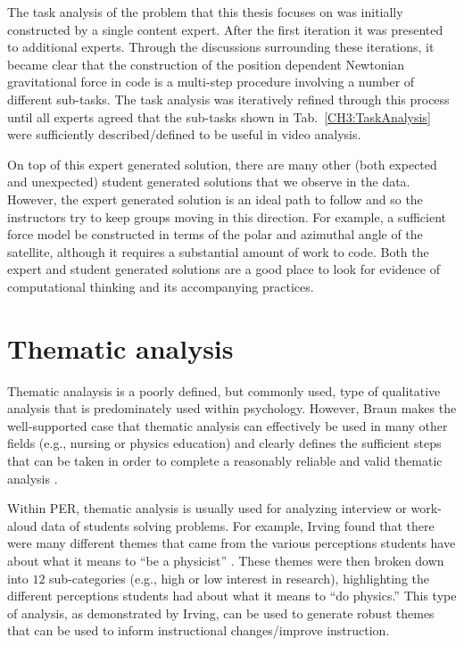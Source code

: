 \documentclass{msuphddissertation}
\begin{document}
\begin{doublespace}
The task analysis of the problem that this thesis focuses on was initially constructed by a single content expert.  After the first iteration it was presented to additional experts.  Through the discussions surrounding these iterations, it became clear that the construction of the position dependent Newtonian gravitational force in code is a multi-step procedure involving a number of different sub-tasks.  The task analysis was iteratively refined through this process until all experts agreed that the sub-tasks shown in Tab.~\ref{CH3:TaskAnalysis} were sufficiently described/defined to be useful in video analysis.
 
On top of this expert generated solution, there are many other (both expected and unexpected) student generated solutions that we observe in the data.  However, the expert generated solution is an ideal path to follow and so the instructors try to keep groups moving in this direction.  For example, a sufficient force model be constructed in terms of the polar and azimuthal angle of the satellite, although it requires a substantial amount of work to code.  Both the expert and student generated solutions are a good place to look for evidence of computational thinking and its accompanying practices.

\section{Thematic analysis}\label{CH2:Thematic}

Thematic analaysis is a poorly defined, but commonly used, type of qualitative analysis that is predominately used within psychology.  However, Braun makes the well-supported case that thematic analysis can effectively be used in many other fields (e.g., nursing or physics education) and clearly defines the sufficient steps that can be taken in order to complete a reasonably reliable and valid thematic analysis \cite{Braun2008,Fereda2006,Aronson1995,Vaismoradi2013,Joffe2004,Potter1997,Antaki2002}.

Within PER, thematic analysis is usually used for analyzing interview or work-aloud data of students solving problems.  For example, Irving found that there were many different themes that came from the various perceptions students have about what it means to ``be a physicist'' \cite{Irving2016}.  These themes were then broken down into $12$ sub-categories (e.g., high or low interest in research), highlighting the different perceptions students had about what it means to ``do physics.''  This type of analysis, as demonstrated by Irving, can be used to generate robust themes that can be used to inform instructional changes/improve instruction.


\end{doublespace}
\end{document}
